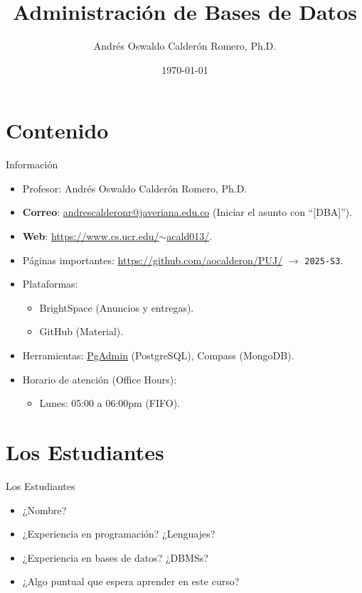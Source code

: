 \documentclass{beamer}
\title{Administración de Bases de Datos}
\author{Andrés Oswaldo Calderón Romero, Ph.D.}
\date{\today}
\begin{document}
\frame{\titlepage}

\section{Contenido}

\begin{frame}{Información}
\begin{itemize}
    \item Profesor: Andrés Oswaldo Calderón Romero, Ph.D.
    \item \textbf{Correo}: \href{mailto:andrescalderonr@javeriana.edu.co}{andrescalderonr@javeriana.edu.co} (Iniciar el asunto con ``[DBA]'').
    \item \textbf{Web}: \href{https://www.cs.ucr.edu/~acald013/}{https://www.cs.ucr.edu/$\sim$acald013/}.
    \item Páginas importantes: \url{https://github.com/aocalderon/PUJ/} $\longrightarrow$ \texttt{2025-S3}.
    \item Plataformas: 
    \begin{itemize}
        \item BrightSpace (Anuncios y entregas).
        \item GitHub (Material).
    \end{itemize}
    \item Herramientas: \href{https://www.pgadmin.org/}{PgAdmin} (PostgreSQL), Compass (MongoDB).
    \item Horario de atención (Office Hours):
    \begin{itemize}
        \item Lunes: 05:00 a 06:00pm (FIFO).
    \end{itemize}
\end{itemize}
\end{frame}

\section{Los Estudiantes}

\begin{frame}{Los Estudiantes}
\begin{itemize}
    \item ¿Nombre? 
    \item ¿Experiencia en programación? ¿Lenguajes? 
    \item ¿Experiencia en bases de datos? ¿DBMSs?
    \item ¿Algo puntual que espera aprender en este curso?
\end{itemize}
\end{frame}
\end{document}
